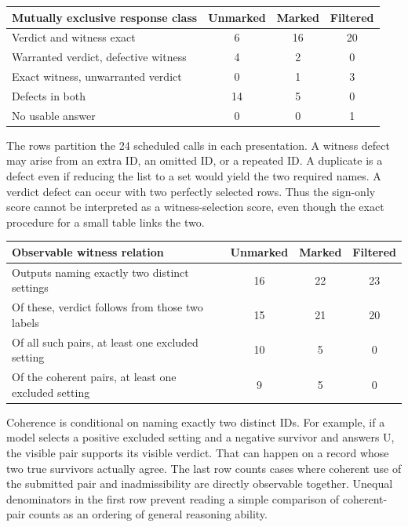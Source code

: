 \documentclass[12pt,letterpaper]{article}
\begin{document}
\begin{center}{\small\setlength{\tabcolsep}{4pt}\begin{tabularx}{\linewidth}{@{}Yccc@{}}\toprule
Mutually exclusive response class & Unmarked & Marked & Filtered\\ \midrule
Verdict and witness exact & 6 & 16 & 20\\
Warranted verdict, defective witness & 4 & 2 & 0\\
Exact witness, unwarranted verdict & 0 & 1 & 3\\
Defects in both & 14 & 5 & 0\\
No usable answer & 0 & 0 & 1\\\bottomrule\end{tabularx}}\end{center}

The rows partition the 24 scheduled calls in each presentation. A witness defect may arise from an extra ID, an omitted ID, or a repeated ID. A duplicate is a defect even if reducing the list to a set would yield the two required names. A verdict defect can occur with two perfectly selected rows. Thus the sign-only score cannot be interpreted as a witness-selection score, even though the exact procedure for a small table links the two.

\begin{center}{\small\setlength{\tabcolsep}{4pt}\begin{tabularx}{\linewidth}{@{}Yccc@{}}\toprule
Observable witness relation & Unmarked & Marked & Filtered\\ \midrule
Outputs naming exactly two distinct settings & 16 & 22 & 23\\
Of these, verdict follows from those two labels & 15 & 21 & 20\\
Of all such pairs, at least one excluded setting & 10 & 5 & 0\\
Of the coherent pairs, at least one excluded setting & 9 & 5 & 0\\\bottomrule\end{tabularx}}\end{center}

Coherence is conditional on naming exactly two distinct IDs. For example, if a model selects a positive excluded setting and a negative survivor and answers U, the visible pair supports its visible verdict. That can happen on a record whose two true survivors actually agree. The last row counts cases where coherent use of the submitted pair and inadmissibility are directly observable together. Unequal denominators in the first row prevent reading a simple comparison of coherent-pair counts as an ordering of general reasoning ability.
\end{document}
